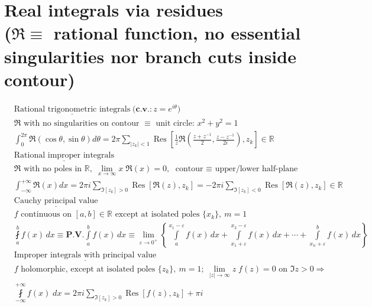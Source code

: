 \section*{Real integrals via residues\\\normalfont\scriptsize{ ($\mathfrak{R}\equiv$ rational function, no essential singularities nor branch cuts inside contour)}}
\begin{align*}
    &\underline{\text{Rational trigonometric integrals}} \;  
    {(\textbf{c.v.}}\!: z=e^{i\theta})\\
    &\mathfrak{R}\text{ with no singularities on contour $\equiv$ unit circle: $x^2 +y^2 = 1$ }\\
    &\int_0^{2\pi} \!\mathfrak{R}(\cos\theta, \sin\theta)d\theta = 2\pi \sum_{|z_k|<1} \operatorname{Res}\left[\frac{1}{z}\mathfrak{R}\left(\frac{z+z^{-1}}{2}, \frac{z-z^{-1}}{2i}\right), z_k\right]\in \mathbb{R}\\
    &\underline{\text{Rational improper integrals}}\\
    &\mathfrak{R} \text{ with no poles in }\mathbb{R}, \; \lim_{x\rightarrow \infty} x\;\!\mathfrak{R}(x) = 0, \text{ contour $\equiv$ upper/lower half-plane}\\
    &\int_{-\infty}^{+\infty}\!\mathfrak{R}(x)dx = 2\pi i \sum_{\Im \left[z_k\right] > 0} \operatorname{Res}\left[\mathfrak{R}(z), z_k\right] = -2\pi i \sum_{\Im \left[z_k\right] < 0} \operatorname{Res}\left[\mathfrak{R}(z), z_k\right] \in \mathbb{R}\\
    &\underline{\text{Cauchy principal value}}\\ &f \text{ continuous on } [a,b]\in \mathbb{R} \text{ except at isolated poles } \{x_k\}, \ m =1\\
    &\fint\limits_a^b \! f(x) \, dx \equiv \mathbf{P.V.} \int\limits_a^b \! f(x) \, dx \equiv \!\!\!\lim_{\varepsilon \to 0^+} \!\!\left\{ 
    \int\limits_a^{x_1 - \varepsilon} \!\!\!\!\! f(x) \, dx + \int\limits_{x_1 + \varepsilon}^{x_2 - \varepsilon} \!\!\!\!\! f(x) \, dx + \cdots + \int\limits_{x_n + \varepsilon}^b \!\!\!\!\!f(x) \, dx \right\}\\
    &\underline{\text{Improper integrals with principal value}}\\
    &f \text{ holomorphic, except at isolated poles } \{z_k\},\ m=1; \  
    \lim_{|z|\rightarrow\infty}\!\!\! z\; \! f(z) \!=\! 0 \text{ on } \Im z \!>\!0\Rightarrow\\
     &\fint\limits_{-\infty}^{+\infty}\!\!f(x)\;\!dx \!=\! 2\pi i\!\!\!\!\!\!\!\!
    \sum_{\Im \left[z_k\right] > 0}\!\!\! \!\!\!\!\!\operatorname{Res}\left[f(z), z_k\right]\!\! +\!\pi i\!\!\!\!\!\!

\end{align*}
